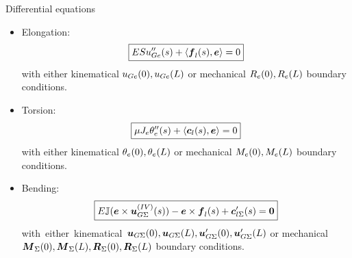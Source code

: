 \begin{frame}{Differential equations}{}

\begin{itemize}
\item Elongation:
\begin{displaymath}
\boxed{ESu_{Ge}''(s)+\left\langle{{\boldsymbol{f}}_l(s),{\boldsymbol{e}}}\right\rangle=0}
\end{displaymath}
with either kinematical $u_{Ge}(0),u_{Ge}(L)$ or mechanical $R_e(0),R_e(L)$ boundary conditions.
\item Torsion:
\begin{displaymath}
\boxed{\mu J_e\theta_e''(s)+\left\langle{{\boldsymbol{c}}_l(s),{\boldsymbol{e}}}\right\rangle=0}
\end{displaymath}
with either kinematical $\theta_e(0),\theta_e(L)$ or mechanical $M_e(0),M_e(L)$ boundary conditions.
\item Bending:
\begin{displaymath}
\boxed{E{\mathbb{J}}({\boldsymbol{e}}\times{\boldsymbol{u}}_{G\Sigma}^{(IV)}(s))-{\boldsymbol{e}}\times{\boldsymbol{f}}_l(s)+{\boldsymbol{c}}_{l\Sigma}'(s)={\bf 0}}
\end{displaymath}
with~either~kinematical~${\boldsymbol{u}}_{G\Sigma}(0),{\boldsymbol{u}}_{G\Sigma}(L),{\boldsymbol{u}}_{G\Sigma}'(0),{\boldsymbol{u}}_{G\Sigma}'(L)$ or mechanical ${\boldsymbol{M}}_\Sigma(0),{\boldsymbol{M}}_\Sigma(L),{\boldsymbol{R}}_\Sigma(0),{\boldsymbol{R}}_\Sigma(L)$ boundary conditions.
\end{itemize}

\end{frame}

